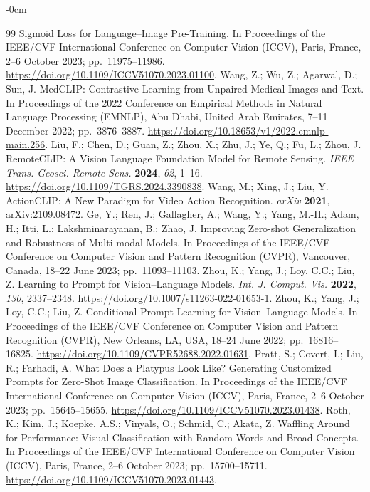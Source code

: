\documentclass[symmetry,article,submit,pdftex,moreauthors]{Definitions/mdpi}
\begin{document}
\begin{adjustwidth}{-\extralength}{0cm}
\begin{thebibliography}{99}
Sigmoid Loss for Language--Image Pre-Training.
In Proceedings of the IEEE/CVF International Conference on Computer Vision (ICCV), Paris, France, 2--6 October 2023; pp.~11975--11986. \url{https://doi.org/10.1109/ICCV51070.2023.01100}.
 Wang, Z.; Wu, Z.; Agarwal, D.; Sun, J.
MedCLIP: Contrastive Learning from Unpaired Medical Images and Text.
In Proceedings of the 2022 Conference on Empirical Methods in Natural Language Processing (EMNLP), Abu Dhabi, United Arab Emirates, 7--11 December 2022; pp.~3876--3887. \url{https://doi.org/10.18653/v1/2022.emnlp-main.256}.
 Liu, F.; Chen, D.; Guan, Z.; Zhou, X.; Zhu, J.; Ye, Q.; Fu, L.; Zhou, J.
RemoteCLIP: A Vision Language Foundation Model for Remote Sensing.
\textit{IEEE Trans. Geosci. Remote Sens.} \textbf{2024}, \textit{62}, 1--16. \url{https://doi.org/10.1109/TGRS.2024.3390838}.
 Wang, M.; Xing, J.; Liu, Y.
ActionCLIP: A New Paradigm for Video Action Recognition.
\textit{arXiv} \textbf{2021}, arXiv:2109.08472.
 Ge, Y.; Ren, J.; Gallagher, A.; Wang, Y.; Yang, M.-H.; Adam, H.; Itti, L.; Lakshminarayanan, B.; Zhao, J.
Improving Zero-shot Generalization and Robustness of Multi-modal Models.
In Proceedings of the IEEE/CVF Conference on Computer Vision and Pattern Recognition (CVPR), Vancouver, Canada, 18--22 June 2023; pp.~11093--11103.
 Zhou, K.; Yang, J.; Loy, C.C.; Liu, Z.
Learning to Prompt for Vision--Language Models.
\textit{Int. J. Comput. Vis.} \textbf{2022}, \textit{130}, 2337--2348. \url{https://doi.org/10.1007/s11263-022-01653-1}.
 Zhou, K.; Yang, J.; Loy, C.C.; Liu, Z.
Conditional Prompt Learning for Vision--Language Models.
In Proceedings of the IEEE/CVF Conference on Computer Vision and Pattern Recognition (CVPR), New Orleans, LA, USA, 18--24 June 2022; pp.~16816--16825. \url{https://doi.org/10.1109/CVPR52688.2022.01631}.
 Pratt, S.; Covert, I.; Liu, R.; Farhadi, A.
What Does a Platypus Look Like? Generating Customized Prompts for Zero-Shot Image Classification.
In Proceedings of the IEEE/CVF International Conference on Computer Vision (ICCV), Paris, France, 2--6 October 2023; pp.~15645--15655. \url{https://doi.org/10.1109/ICCV51070.2023.01438}.
 Roth, K.; Kim, J.; Koepke, A.S.; Vinyals, O.; Schmid, C.; Akata, Z.
Waffling Around for Performance: Visual Classification with Random Words and Broad Concepts.
In Proceedings of the IEEE/CVF International Conference on Computer Vision (ICCV), Paris, France, 2--6 October 2023; pp.~15700--15711. \url{https://doi.org/10.1109/ICCV51070.2023.01443}.

\end{thebibliography}
\end{adjustwidth}
\end{document}
